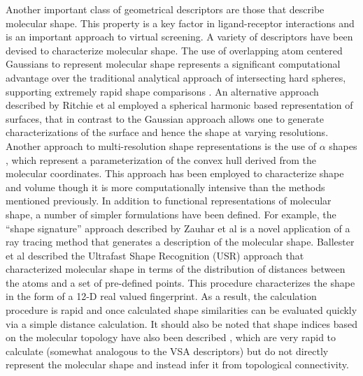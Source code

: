 \documentclass[letterpaper, 12pt]{article}
\begin{document}
Another important class of geometrical descriptors are those that
describe molecular shape. This property is a key factor in
ligand-receptor interactions and is an important approach to virtual
screening. A variety of descriptors have been devised to characterize
molecular shape. The use of overlapping atom centered Gaussians to
represent molecular shape \cite{Grant:1995aa} represents a significant
computational advantage over the traditional analytical approach of
intersecting hard spheres, supporting extremely rapid shape
comparisons \cite{Grant:1999vn}. An alternative approach described by
Ritchie et al \cite{Ritchie:1999kx} employed a spherical harmonic
based representation of surfaces, that in contrast to the Gaussian
approach allows one to generate characterizations of the surface and
hence the shape at varying resolutions. Another approach to
multi-resolution shape representations is the use of $\alpha$ shapes
\cite{Edelsbrunner:1994aa}, which represent a parameterization of the
convex hull derived from the molecular coordinates. This approach has
been employed to characterize shape and volume \cite{Wilson:2009ys}
though it is more computationally intensive than the methods mentioned
previously. In addition to functional representations of molecular
shape, a number of simpler formulations have been defined. For
example, the ``shape signature'' approach described by Zauhar et al
\cite{Zauhar:2003fk} is a novel application of a ray tracing method
that generates a description of the molecular shape. Ballester et al
\cite{Ballester:2007aa} described the Ultrafast Shape Recognition
(USR) approach that characterized molecular shape in terms of the
distribution of distances between the atoms and a set of pre-defined
points. This procedure characterizes the shape in the form of a 12-D
real valued fingerprint. As a result, the calculation procedure is
rapid and once calculated shape similarities can be evaluated quickly
via a simple distance calculation. It should also be noted that shape
indices based on the molecular topology have also been described
\cite{Kier:1985aa}, which are very rapid to calculate (somewhat
analogous to the VSA descriptors) but do not directly represent the
molecular shape and instead infer it from topological connectivity.
\end{document}
